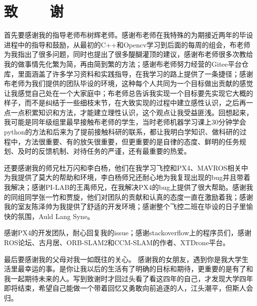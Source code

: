 

\renewcommand{\baselinestretch}{1.5}
\fontsize{12pt}{13pt}\selectfont

\chapter*{致~~~~谢}

首先要感谢我的指导老师布树辉老师。感谢布老师在我特殊的为期接近两年的毕设进程中的指导和鼓励，从最初的C++和Opencv学习到后面的每周的组会，布老师为我指出了很多问题，同时也提出了很多醍醐灌顶的建议，感谢布老师很多次教给我的做事情先化繁为简，再由简到繁的方法；感谢布老师努力经营的Gitee平台仓库，里面涵盖了许多学习资料和实践指导，在我学习的路上提供了一条捷径；感谢布老师为我们提供的团队毕设的环境，这种每个人共同为一个目标做出贡献的感觉让我感觉自己处在一个大家庭中；布老师总告诉我实现一个目标要先实现它大概的样子，而不是纠结于一些细枝末节，在大致实现的过程中建立感性认识，之后再一点一点积累知识和方法，才能建立理性认识，这个观点让我受益匪浅。回想起来，我可能是同年级组里最早接触布老师的学生，当时老师机器学习课上30分钟学会python的方法和后来为了提前接触科研的联系，都让我明白学知识、做科研的过程中，方法很重要、有的放矢很重要，但更重要的是自律的态度、鲜明的任务规划、及时的反馈机制、对待任务的严谨，还有最重要的热爱。

还要感谢我的师兄杜万闪和李白杨，他们在我学习飞控和PX4、MAVROS相关中为我提供了莫大的帮助和环境，李白杨师兄还耐心地为我复现出现的bug并且带着我解决；感谢PI-LAB的王禹师兄，在我解决PX4的bug上提供了很大帮助。感谢我的同组同学张一竹和贾旋，他们对团队的贡献和认真的态度一直在激励着我；感谢我的室友陈泽帅为我提供了舒适的开发环境；感谢整个飞控二班在毕设的日子里愉快的氛围，Auld Lang Syne。

感谢PX4的开发团队，耐心回复我的issue；感谢stackoverflow上的程序员们，感谢ROS论坛、古月居、ORB-SLAM2和CCM-SLAM的作者、XTDrone平台。

最后要感谢我的父母对我一如既往的关心。
感谢我的女朋友，遇到你是我大学生活里最幸运的事。是你让我以后的生活有了明确的目标和期待，更重要的是有了和我一起期待未来的人。写到致谢时才回过头看了看这四年的自己，才发现大学四年即将结束，希望自己能做一个带着回忆又勇敢向前追逐的人，江头潮平，但斯人会归。

